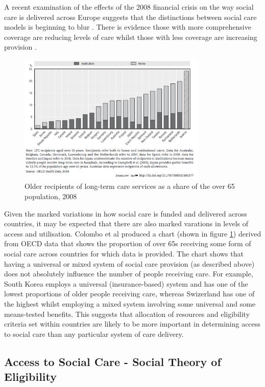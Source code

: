 \documentclass[12pt,]{report}
\begin{document}
A recent examination of the effects of the 2008 financial crisis on the
way social care is delivered across Europe suggests that the
distinctions between social care models is beginning to blur
\citep{RN343}. There is evidence those with more comprehensive coverage
are reducing levels of care whilst those with less coverage are
increasing provision \citep{RN414}.

\begin{figure}
  \centering
  \caption{Older recipients of long-term care services as a share of the over 65 population, 2008}
  \label{fig:oecd-comparison}
    \includegraphics[width=0.8\textwidth]{figures/oecd-comparison.PNG}
\end{figure}

Given the marked variations in how social care is funded and delivered
across countries, it may be expected that there are also marked
varations in levels of access and utilisation. Colombo et al
\citeyearpar{RN414} produced a chart (shown in figure
\ref{fig:oecd-comparison}) derived from OECD data that shows the
proportion of over 65s receiving some form of social care across
countries for which data is provided. The chart shows that having a
universal or mixed system of social care provision (as described above)
does not absolutely influence the number of people receiving care. For
example, South Korea employs a universal (insurance-based) system and
has one of the lowest proportions of older people receiving care,
whereas Swizerland has one of the highest whilst employing a mixed
system involving some universal and some means-tested benefits. This
suggests that allocation of resources and eligibility criteria set
within countries are likely to be more important in determining access
to social care than any particular system of care delivery.

\subsection{Access to Social Care - Social Theory of Eligibility}\label{subsubsec:eligibility-theory}
\end{document}
